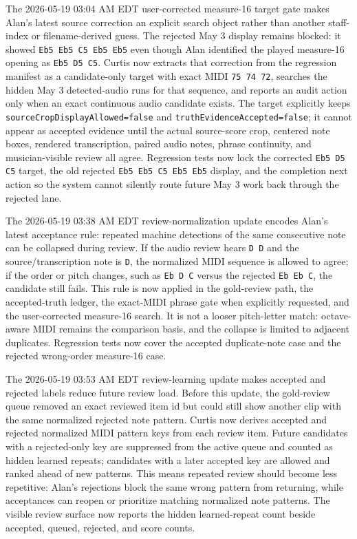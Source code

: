 \documentclass[12pt,letterpaper]{article}
\begin{document}
The 2026-05-19 03:04 AM EDT user-corrected measure-16 target gate makes Alan's latest source correction an explicit search object rather than another staff-index or filename-derived guess. The rejected May 3 display remains blocked: it showed \texttt{Eb5 Eb5 C5 Eb5 Eb5} even though Alan identified the played measure-16 opening as \texttt{Eb5 D5 C5}. Curtis now extracts that correction from the regression manifest as a candidate-only target with exact MIDI \texttt{75 74 72}, searches the hidden May 3 detected-audio runs for that sequence, and reports an audit action only when an exact continuous audio candidate exists. The target explicitly keeps \texttt{sourceCropDisplayAllowed=false} and \texttt{truthEvidenceAccepted=false}; it cannot appear as accepted evidence until the actual source-score crop, centered note boxes, rendered transcription, paired audio notes, phrase continuity, and musician-visible review all agree. Regression tests now lock the corrected \texttt{Eb5 D5 C5} target, the old rejected \texttt{Eb5 Eb5 C5 Eb5 Eb5} display, and the completion next action so the system cannot silently route future May 3 work back through the rejected lane.

The 2026-05-19 03:38 AM EDT review-normalization update encodes Alan's latest acceptance rule: repeated machine detections of the same consecutive note can be collapsed during review. If the audio review hears \texttt{D D} and the source/transcription note is \texttt{D}, the normalized MIDI sequence is allowed to agree; if the order or pitch changes, such as \texttt{Eb D C} versus the rejected \texttt{Eb Eb C}, the candidate still fails. This rule is now applied in the gold-review path, the accepted-truth ledger, the exact-MIDI phrase gate when explicitly requested, and the user-corrected measure-16 search. It is not a looser pitch-letter match: octave-aware MIDI remains the comparison basis, and the collapse is limited to adjacent duplicates. Regression tests now cover the accepted duplicate-note case and the rejected wrong-order measure-16 case.

The 2026-05-19 03:53 AM EDT review-learning update makes accepted and rejected labels reduce future review load. Before this update, the gold-review queue removed an exact reviewed item id but could still show another clip with the same normalized rejected note pattern. Curtis now derives accepted and rejected normalized MIDI pattern keys from each review item. Future candidates with a rejected-only key are suppressed from the active queue and counted as hidden learned repeats; candidates with a later accepted key are allowed and ranked ahead of new patterns. This means repeated review should become less repetitive: Alan's rejections block the same wrong pattern from returning, while acceptances can reopen or prioritize matching normalized note patterns. The visible review surface now reports the hidden learned-repeat count beside accepted, queued, rejected, and score counts.
\end{document}
